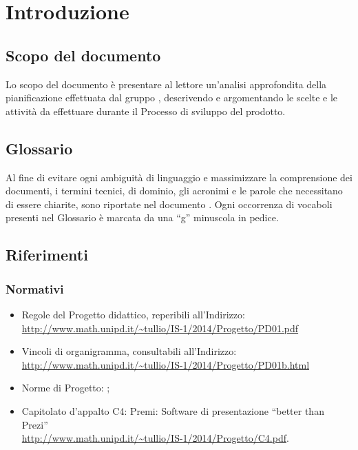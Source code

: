 \section{Introduzione}
\subsection{Scopo del documento}
Lo scopo del documento è presentare al lettore un'analisi approfondita della pianificazione effettuata dal gruppo \gruppo, descrivendo e argomentando le scelte e le attività da effettuare durante il Processo di sviluppo del prodotto.
\subsection{Glossario}
Al fine di evitare ogni ambiguità di linguaggio e massimizzare la comprensione dei documenti, i termini tecnici, di dominio, gli acronimi e le parole che necessitano di essere chiarite, sono riportate nel documento \href{run:../../Esterni/\fGlossario}{\fEscapeGlossario}. Ogni occorrenza di vocaboli presenti nel Glossario è marcata da una “g” minuscola in pedice.
\subsection{Riferimenti}

\subsubsection{Normativi}
\begin{itemize}

\item Regole del Progetto didattico, reperibili all'Indirizzo:\\ \url{http://www.math.unipd.it/~tullio/IS-1/2014/Progetto/PD01.pdf}
\item Vincoli di organigramma, consultabili all’Indirizzo:\\ \url{http://www.math.unipd.it/~tullio/IS-1/2014/Progetto/PD01b.html}
\item Norme di Progetto: \href{run:../../Interni/\fNormeDiProgetto}{\fEscapeNormeDiProgetto};
\item Capitolato d’appalto C4: Premi: Software di presentazione “better than Prezi” \\
\url{http://www.math.unipd.it/~tullio/IS-1/2014/Progetto/C4.pdf}.
\end{itemize}

